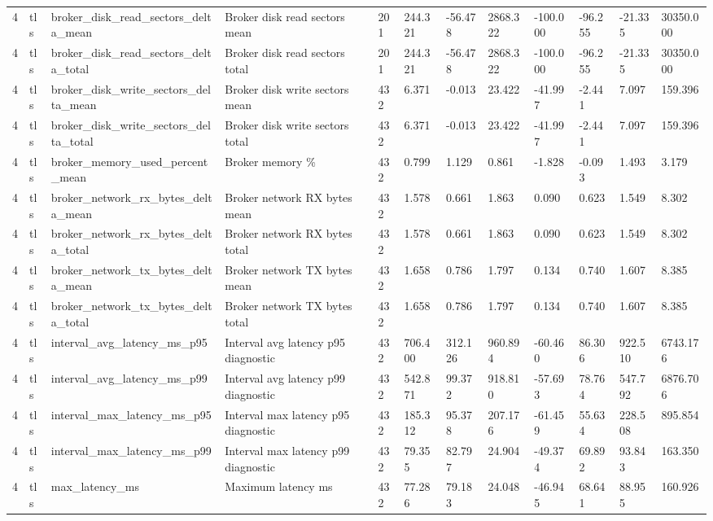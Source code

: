 \begin{longtable}{llllllllllll}
4 & tls & broker\_disk\_read\_sectors\_delta\_mean & Broker disk read sectors mean & 201 & 244.321 & -56.478 & 2868.322 & -100.000 & -96.255 & -21.335 & 30350.000 \\
4 & tls & broker\_disk\_read\_sectors\_delta\_total & Broker disk read sectors total & 201 & 244.321 & -56.478 & 2868.322 & -100.000 & -96.255 & -21.335 & 30350.000 \\
4 & tls & broker\_disk\_write\_sectors\_delta\_mean & Broker disk write sectors mean & 432 & 6.371 & -0.013 & 23.422 & -41.997 & -2.441 & 7.097 & 159.396 \\
4 & tls & broker\_disk\_write\_sectors\_delta\_total & Broker disk write sectors total & 432 & 6.371 & -0.013 & 23.422 & -41.997 & -2.441 & 7.097 & 159.396 \\
4 & tls & broker\_memory\_used\_percent\_mean & Broker memory \% & 432 & 0.799 & 1.129 & 0.861 & -1.828 & -0.093 & 1.493 & 3.179 \\
4 & tls & broker\_network\_rx\_bytes\_delta\_mean & Broker network RX bytes mean & 432 & 1.578 & 0.661 & 1.863 & 0.090 & 0.623 & 1.549 & 8.302 \\
4 & tls & broker\_network\_rx\_bytes\_delta\_total & Broker network RX bytes total & 432 & 1.578 & 0.661 & 1.863 & 0.090 & 0.623 & 1.549 & 8.302 \\
4 & tls & broker\_network\_tx\_bytes\_delta\_mean & Broker network TX bytes mean & 432 & 1.658 & 0.786 & 1.797 & 0.134 & 0.740 & 1.607 & 8.385 \\
4 & tls & broker\_network\_tx\_bytes\_delta\_total & Broker network TX bytes total & 432 & 1.658 & 0.786 & 1.797 & 0.134 & 0.740 & 1.607 & 8.385 \\
4 & tls & interval\_avg\_latency\_ms\_p95 & Interval avg latency p95 diagnostic & 432 & 706.400 & 312.126 & 960.894 & -60.460 & 86.306 & 922.510 & 6743.176 \\
4 & tls & interval\_avg\_latency\_ms\_p99 & Interval avg latency p99 diagnostic & 432 & 542.871 & 99.372 & 918.810 & -57.693 & 78.764 & 547.792 & 6876.706 \\
4 & tls & interval\_max\_latency\_ms\_p95 & Interval max latency p95 diagnostic & 432 & 185.312 & 95.378 & 207.176 & -61.459 & 55.634 & 228.508 & 895.854 \\
4 & tls & interval\_max\_latency\_ms\_p99 & Interval max latency p99 diagnostic & 432 & 79.355 & 82.797 & 24.904 & -49.374 & 69.892 & 93.843 & 163.350 \\
4 & tls & max\_latency\_ms & Maximum latency ms & 432 & 77.286 & 79.183 & 24.048 & -46.945 & 68.641 & 88.955 & 160.926 \\

\end{longtable}
